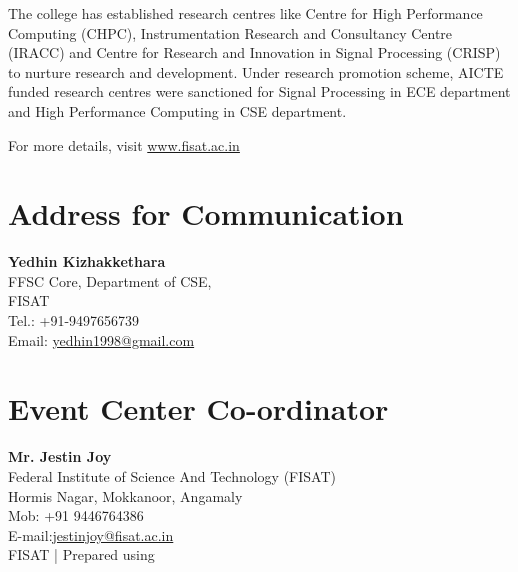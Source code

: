 \documentclass[notuble,10pt,a4paper]{leaflet}
\begin{document}
The college has established research centres like Centre for High Performance Computing (CHPC), Instrumentation Research and Consultancy Centre (IRACC) and Centre for Research and Innovation in Signal Processing (CRISP) to nurture research and development. Under research promotion scheme, AICTE funded research centres were sanctioned for Signal Processing in ECE department and High Performance Computing in CSE department. 

For more details, visit \url{www.fisat.ac.in}

\section{{\Large Address for Communication}}
\textbf{Yedhin Kizhakkethara}\\
FFSC Core, Department of CSE,\\ 
FISAT\\
Tel.: +91-9497656739\\
Email:  \url{yedhin1998@gmail.com}

\section{{\Large Event Center Co-ordinator}}
\textbf{Mr. Jestin Joy}\\
Federal Institute of Science And Technology (FISAT)\\
Hormis Nagar, Mokkanoor, Angamaly\\
Mob: +91 9446764386\\
E-mail:\url{jestinjoy@fisat.ac.in}\\

\vfill
\footnotesize{\textcopyright FISAT | Prepared using \LaTeXe}



\end{document}
